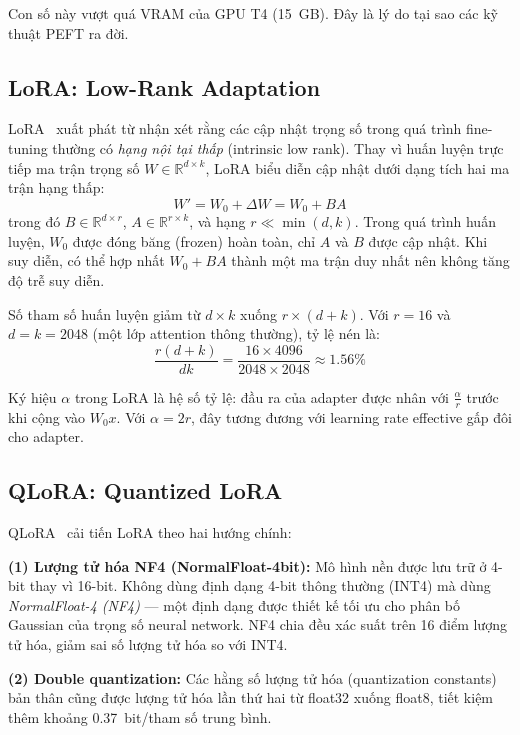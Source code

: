 \documentclass[fontsize=13pt,a4paper,oneside,DIV=calc,chapterprefix=true]{scrbook}
\begin{document}
Con số này vượt quá VRAM của GPU T4 (15~GB). Đây là lý do tại sao các kỹ thuật PEFT ra đời.

\subsection{LoRA: Low-Rank Adaptation}

LoRA~\cite{lora} xuất phát từ nhận xét rằng các cập nhật trọng số trong quá trình fine-tuning
thường có \textit{hạng nội tại thấp} (intrinsic low rank). Thay vì huấn luyện trực tiếp ma
trận trọng số $W \in \mathbb{R}^{d \times k}$, LoRA biểu diễn cập nhật dưới dạng tích hai
ma trận hạng thấp:
\begin{equation}
  W' = W_0 + \Delta W = W_0 + BA
  \label{eq:lora}
\end{equation}
trong đó $B \in \mathbb{R}^{d \times r}$, $A \in \mathbb{R}^{r \times k}$, và hạng $r \ll
\min(d, k)$. Trong quá trình huấn luyện, $W_0$ được đóng băng (frozen) hoàn toàn, chỉ $A$
và $B$ được cập nhật. Khi suy diễn, có thể hợp nhất $W_0 + BA$ thành một ma trận duy nhất
nên không tăng độ trễ suy diễn.

Số tham số huấn luyện giảm từ $d \times k$ xuống $r \times (d + k)$. Với $r = 16$ và
$d = k = 2048$ (một lớp attention thông thường), tỷ lệ nén là:
\begin{equation}
  \frac{r(d+k)}{dk} = \frac{16 \times 4096}{2048 \times 2048} \approx 1.56\%
\end{equation}

Ký hiệu $\alpha$ trong LoRA là hệ số tỷ lệ: đầu ra của adapter được nhân với $\frac{\alpha}{r}$
trước khi cộng vào $W_0 x$. Với $\alpha = 2r$, đây tương đương với learning rate effective gấp
đôi cho adapter.

\subsection{QLoRA: Quantized LoRA}

QLoRA~\cite{qlora} cải tiến LoRA theo hai hướng chính:

\textbf{(1) Lượng tử hóa NF4 (NormalFloat-4bit):} Mô hình nền được lưu trữ ở 4-bit thay vì
16-bit. Không dùng định dạng 4-bit thông thường (INT4) mà dùng \textit{NormalFloat-4 (NF4)} ---
một định dạng được thiết kế tối ưu cho phân bố Gaussian của trọng số neural network. NF4 chia
đều xác suất trên 16 điểm lượng tử hóa, giảm sai số lượng tử hóa so với INT4.

\textbf{(2) Double quantization:} Các hằng số lượng tử hóa (quantization constants) bản thân
cũng được lượng tử hóa lần thứ hai từ float32 xuống float8, tiết kiệm thêm khoảng 0.37~bit/tham
số trung bình.
\end{document}
